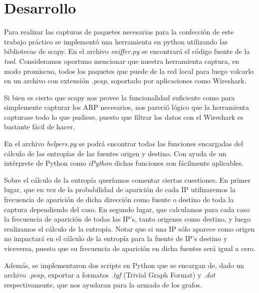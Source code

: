 \section{Desarrollo}

Para realizar las capturas de paquetes necesarias para la confección de este trabajo práctico se implementó una herramienta en python utilizando las bibliotecas de scapy. En el archivo \textit{sniffer.py} se encontrará el código fuente de la \textit{tool}. Consideramos oportuno mencionar que nuestra herramienta captura, en modo promiscuo, todos los paquetes que puede de la red local para luego volcarlo en un archivo con extensión \textit{.pcap}, soportado por aplicaciones como Wireshark.\newline

Si bien es cierto que scapy nos provee la funcionalidad suficiente como para simplemente capturar los ARP necesarios, nos pareció lógico que la herramienta capturase todo lo que pudiese, puesto que filtrar los datos con el Wireshark es bastante fácil de hacer.\newline

En el archivo \textit{helpers.py} se podrá encontrar todas las funciones encargadas del cálculo de las entropías de las fuentes origen y destino. Con ayuda de un intérprete de Python como \textit{iPython} dichas funciones son fácilmente aplicables.\newline

Sobre el cálculo de la entropía queríamos comentar ciertas cuestiones. En primer lugar, que en vez de la probabilidad de aparición de cada IP utilizaremos la frecuencia de aparición de dicha dirección como fuente o destino de toda la captura dependiendo del caso. En segundo lugar, que calculamos para cada caso la frecuencia de aparición de todas las IP's, tanto origenes como destino, y luego realizamos el cálculo de la entropía. Notar que si una IP sólo aparece como origen no impactará en el cálculo de la entropía para la fuente de IP's destino y viceversa, puesto que su frecuencia de aparición en dicha fuentes será igual a cero.\newline

Además, se implementaron dos scripts en Python que se encargan de, dado un archivo \textit{.pcap}, exportar a formatos \textit{.tgf} (Trivial Graph Format) y \textit{.dot} respectivamente, que nos ayudaran para la armado de los grafos.\newline
